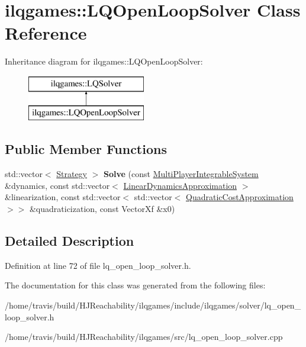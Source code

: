 \hypertarget{classilqgames_1_1_l_q_open_loop_solver}{}\section{ilqgames\+:\+:L\+Q\+Open\+Loop\+Solver Class Reference}
\label{classilqgames_1_1_l_q_open_loop_solver}
Inheritance diagram for ilqgames\+:\+:L\+Q\+Open\+Loop\+Solver\+:\begin{figure}[H]
\begin{center}
\leavevmode
\includegraphics[height=2.000000cm]{classilqgames_1_1_l_q_open_loop_solver}
\end{center}
\end{figure}
\subsection*{Public Member Functions}
\begin{DoxyCompactItemize}
\item 
std\+::vector$<$ \hyperlink{structilqgames_1_1_strategy}{Strategy} $>$ {\bfseries Solve} (const \hyperlink{classilqgames_1_1_multi_player_integrable_system}{Multi\+Player\+Integrable\+System} \&dynamics, const std\+::vector$<$ \hyperlink{structilqgames_1_1_linear_dynamics_approximation}{Linear\+Dynamics\+Approximation} $>$ \&linearization, const std\+::vector$<$ std\+::vector$<$ \hyperlink{structilqgames_1_1_quadratic_cost_approximation}{Quadratic\+Cost\+Approximation} $>$$>$ \&quadraticization, const Vector\+Xf \&x0)\hypertarget{classilqgames_1_1_l_q_open_loop_solver_ad7d6f8df8329934d07ea7c2d1f30a4c6}{}\label{classilqgames_1_1_l_q_open_loop_solver_ad7d6f8df8329934d07ea7c2d1f30a4c6}

\end{DoxyCompactItemize}


\subsection{Detailed Description}


Definition at line 72 of file lq\+\_\+open\+\_\+loop\+\_\+solver.\+h.



The documentation for this class was generated from the following files\+:\begin{DoxyCompactItemize}
\item 
/home/travis/build/\+H\+J\+Reachability/ilqgames/include/ilqgames/solver/lq\+\_\+open\+\_\+loop\+\_\+solver.\+h\item 
/home/travis/build/\+H\+J\+Reachability/ilqgames/src/lq\+\_\+open\+\_\+loop\+\_\+solver.\+cpp\end{DoxyCompactItemize}

